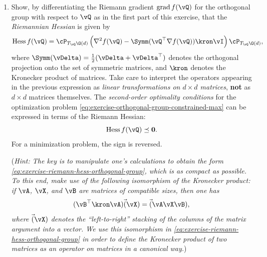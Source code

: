 \documentclass[../../book-main.tex]{subfiles}
\begin{document}
\begin{exercise}
\begin{enumerate}
            is known as the \textit{Riemannian gradient} of the
            function $f$ restricted to the orthogonal group.
            The \textit{first order optimality conditions} for the
            optimization problem
            \eqref{eq:exercise-orthogonal-group-constrained-max} can
            be expressed in terms of the Riemann gradient:
            \begin{equation*}
                \mathrm{grad}\, f(\vQ) = \mathbf{0}.
            \end{equation*}
        \item Show, by differentiating the Riemann gradient
            $\mathrm{grad}\, f(\vQ)$ for the orthogonal group with
            respect to $\vQ$ as in the first part of this exercise,
            that the \textit{Riemannian Hessian} is given by
            \begin{equation}\label{eq:exercise-riemann-hess-orthogonal-group}
                \mathrm{Hess}\, f(\vQ) = \cP_{T_{\vQ}\O(d)} \left(
                    \nabla^2 f(\vQ) - \Symm(\vQ^\top \nabla f(\vQ)) \kron \vI
                \right) \cP_{T_{\vQ}\O(d)},
            \end{equation}
            where $\Symm(\vDelta) = \tfrac{1}{2}(\vDelta +
            \vDelta^\top)$ denotes the orthogonal projection onto the
            set of symmetric matrices, and $\kron$ denotes the
            Kronecker product of matrices.
            Take care to interpret the operators appearing in the
            previous expression as \textit{linear transformations on
            ${d \times d}$ matrices}, \textbf{not} as $d \times d$
            matrices themselves.
            The \textit{second-order optimality conditions} for the
            optimization problem
            \eqref{eq:exercise-orthogonal-group-constrained-max} can
            be expressed in terms of the Riemann Hessian:
            \begin{equation*}
                \mathrm{Hess}\, f(\vQ) \preceq \mathbf{0}.
            \end{equation*}
            For a minimization problem, the sign is reversed.

            (\textit{Hint: The key is to manipulate one's
                    calculations to obtain the form
                    \eqref{eq:exercise-riemann-hess-orthogonal-group},
                    which is as compact as possible. To this end,
                    make use of the following isomorphism of the
                    Kronecker product: if $\vA$, $\vX$, and $\vB$ are
                    matrices of compatible sizes, then one has
                    \begin{equation*}
                        (\vB^\top \kron \vA) \Vec(\vX) = \Vec(\vA \vX \vB),
                    \end{equation*}
                    where $\Vec(\vX)$ denotes the ``left-to-right'' stacking
                    of the columns of the matrix argument into a vector. We
                    use this isomorphism in
                    \eqref{eq:exercise-riemann-hess-orthogonal-group} in
                    order to define the Kronecker product of two matrices as
            an operator on matrices in a canonical way.})


\end{enumerate}
\end{exercise}
\end{document}
